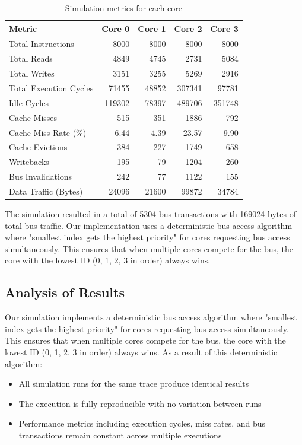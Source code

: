 \documentclass[11pt,a4paper]{article}
\begin{document}
    \begin{table}[H]
    \centering
    \begin{tabular}{@{}lrrrr@{}}
    \toprule
    \textbf{Metric} & \textbf{Core 0} & \textbf{Core 1} & \textbf{Core 2} & \textbf{Core 3} \\
    \midrule
    Total Instructions & 8000 & 8000 & 8000 & 8000 \\
    Total Reads & 4849 & 4745 & 2731 & 5084 \\
    Total Writes & 3151 & 3255 & 5269 & 2916 \\
    Total Execution Cycles & 71455 & 48852 & 307341 & 97781 \\
    Idle Cycles & 119302 & 78397 & 489706 & 351748 \\
    Cache Misses & 515 & 351 & 1886 & 792 \\
    Cache Miss Rate (\%) & 6.44 & 4.39 & 23.57 & 9.90 \\
    Cache Evictions & 384 & 227 & 1749 & 658 \\
    Writebacks & 195 & 79 & 1204 & 260 \\
    Bus Invalidations & 242 & 77 & 1122 & 155 \\
    Data Traffic (Bytes) & 24096 & 21600 & 99872 & 34784 \\
    \bottomrule
    \end{tabular}
    \caption{Simulation metrics for each core}
    \label{tab:results}
    \end{table}

    The simulation resulted in a total of 5304 bus transactions with 169024 bytes of total bus traffic. Our implementation uses a deterministic bus access algorithm where "smallest index gets the highest priority" for cores requesting bus access simultaneously. This ensures that when multiple cores compete for the bus, the core with the lowest ID (0, 1, 2, 3 in order) always wins.

    \subsection{Analysis of Results}

    Our simulation implements a deterministic bus access algorithm where "smallest index gets the highest priority" for cores requesting bus access simultaneously. This ensures that when multiple cores compete for the bus, the core with the lowest ID (0, 1, 2, 3 in order) always wins. As a result of this deterministic algorithm:

    \begin{itemize}[leftmargin=*]
        \item All simulation runs for the same trace produce identical results
        \item The execution is fully reproducible with no variation between runs
        \item Performance metrics including execution cycles, miss rates, and bus transactions remain constant across multiple executions
    \end{itemize}
\end{document}
